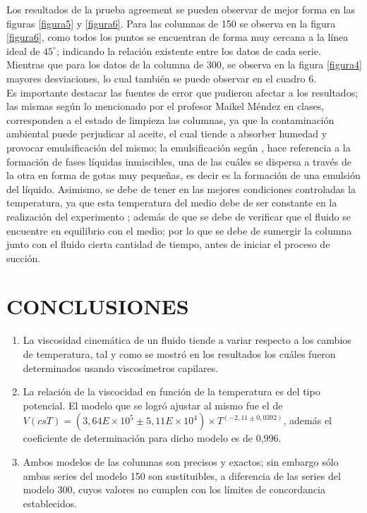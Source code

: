 \documentclass[12pt, letterpaper]{article}
\begin{document}
Los resultados de la prueba agreement se pueden observar de mejor forma en las figuras \ref{figura5} y \ref{figura6}. Para las columnas de 150 se observa en la figura \ref{figura6}, como todos los puntos se encuentran de forma muy cercana a la línea ideal de $45^{\circ}$; indicando la relación existente entre los datos de cada serie. Mientras que para los datos de la columna de 300, se observa en la figura \ref{figura4} mayores desviaciones, lo cual también se puede observar en el cuadro 6.\\ 
Es importante destacar las fuentes de error que pudieron afectar a los resultados; las mismas según lo mencionado por el profesor Maikel Méndez en clases, corresponden a el estado de limpieza las columnas, ya que la contaminación ambiental puede perjudicar al aceite, el cual tiende a absorber humedad y provocar emulsificación del mismo; la emulsificación según \cite{chow}, hace referencia a la formación de fases líquidas inmiscibles, una de las cuáles se dispersa a través de la otra en forma de gotas muy pequeñas, es decir es la formación de una  emulsión del líquido. Asimismo, se debe de tener en las mejores condiciones controladas la temperatura, ya que esta temperatura del medio debe de ser constante en la realización del experimento \cite{coleparmer}; además de que se debe de verificar que el fluido se encuentre en equilibrio con el medio; por lo que se debe de sumergir la columna junto con el fluido cierta cantidad de tiempo, antes de iniciar el proceso de succión.\\

\section{CONCLUSIONES}

\begin{enumerate}
    \item La viscosidad cinemática de un fluido tiende a variar respecto a los cambios de temperatura, tal y como se mostró en los resultados los cuáles fueron determinados usando viscosímetros capilares. 
    \item La relación de la viscocidad en función de la temperatura es del tipo potencial. El modelo que se logró ajustar al mismo fue el de$V(csT)= (3,64E\times10^{5} \pm 5,11E\times10^{4}) \times T^{(-2,11 \pm 0,0392)}$, además el coeficiente de determinación para dicho modelo es de 0,996.
    \item Ambos modelos de las columnas son precisos y exactos; sin embargo sólo ambas series del modelo 150 son sustituibles, a diferencia de las series del modelo 300, cuyos valores no cumplen con los límites de concordancia establecidos.
\end{enumerate}
\end{document}

